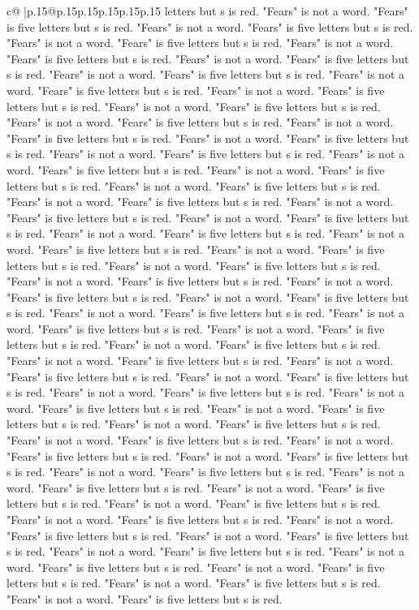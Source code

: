\documentclass{article}
\begin{document}
{\begin{supertabular}{c@{$\;$}|p{.15\linewidth}@{}p{.15\linewidth}p{.15\linewidth}p{.15\linewidth}p{.15\linewidth}p{.15\linewidth}}
{{{letters but s is red. "Fears" is not a word. "Fears" is five letters but s is red. "Fears" is not a word. "Fears" is five letters but s is red. "Fears" is not a word. "Fears" is five letters but s is red. "Fears" is not a word. "Fears" is five letters but s is red. "Fears" is not a word. "Fears" is five letters but s is red. "Fears" is not a word. "Fears" is five letters but s is red. "Fears" is not a word. "Fears" is five letters but s is red. "Fears" is not a word. "Fears" is five letters but s is red. "Fears" is not a word. "Fears" is five letters but s is red. "Fears" is not a word. "Fears" is five letters but s is red. "Fears" is not a word. "Fears" is five letters but s is red. "Fears" is not a word. "Fears" is five letters but s is red. "Fears" is not a word. "Fears" is five letters but s is red. "Fears" is not a word. "Fears" is five letters but s is red. "Fears" is not a word. "Fears" is five letters but s is red. "Fears" is not a word. "Fears" is five letters but s is red. "Fears" is not a word. "Fears" is five letters but s is red. "Fears" is not a word. "Fears" is five letters but s is red. "Fears" is not a word. "Fears" is five letters but s is red. "Fears" is not a word. "Fears" is five letters but s is red. "Fears" is not a word. "Fears" is five letters but s is red. "Fears" is not a word. "Fears" is five letters but s is red. "Fears" is not a word. "Fears" is five letters but s is red. "Fears" is not a word. "Fears" is five letters but s is red. "Fears" is not a word. "Fears" is five letters but s is red. "Fears" is not a word. "Fears" is five letters but s is red. "Fears" is not a word. "Fears" is five letters but s is red. "Fears" is not a word. "Fears" is five letters but s is red. "Fears" is not a word. "Fears" is five letters but s is red. "Fears" is not a word. "Fears" is five letters but s is red. "Fears" is not a word. "Fears" is five letters but s is red. "Fears" is not a word. "Fears" is five letters but s is red. "Fears" is not a word. "Fears" is five letters but s is red. "Fears" is not a word. "Fears" is five letters but s is red. "Fears" is not a word. "Fears" is five letters but s is red. "Fears" is not a word. "Fears" is five letters but s is red. "Fears" is not a word. "Fears" is five letters but s is red. "Fears" is not a word. "Fears" is five letters but s is red. "Fears" is not a word. "Fears" is five letters but s is red. "Fears" is not a word. "Fears" is five letters but s is red. "Fears" is not a word. "Fears" is five letters but s is red. "Fears" is not a word. "Fears" is five letters but s is red. "Fears" is not a word. "Fears" is five letters but s is red. "Fears" is not a word. "Fears" is five letters but s is red. "Fears" is not a word. "Fears" is five letters but s is red. "Fears" is not a word. "Fears" is five letters but s is red. "Fears" is not a word. "Fears" is five letters but s is red. "Fears" is not a word. "Fears" is five letters but s is red. "Fears" is not a word. "Fears" is five letters but s is red. "Fears" is not a word. "Fears" is five letters but s is red. "Fears" is not a word. "Fears" is five letters but s is red. "Fears" is not a word. "Fears" is five letters but s is red. }}}
\end{supertabular}}
\end{document}
